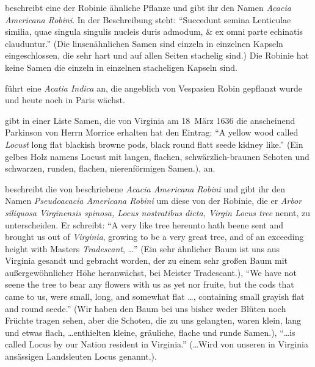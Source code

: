 \documentclass[twocolumn]{scrartcl}
\begin{document}
\citet[S.~171--173]{cornuti1635robinie} beschreibt eine der Robinie
ähnliche Pflanze und gibt ihr den Namen \emph{Acacia Americana
Robini}. In der Beschreibung steht: \enquote{Succedunt semina Lenticulae
similia, quae singula singulis nucleis duris admodum, \& ex omni parte
echinatis clauduntur.} (Die linsenähnlichen Samen sind einzeln in
einzelnen Kapseln eingeschlossen, die sehr hart und auf allen Seiten
stachelig sind.) Die Robinie hat keine Samen die einzeln in einzelnen
stacheligen Kapseln sind.

\citet[S.~28]{deLaBrosse1636robinie} führt eine \emph{Acatia Indica}
an, die angeblich von Vespasien Robin gepflanzt wurde und heute noch
in Paris wächst.

\citet[S.~370]{gunther1922botanists} gibt in einer Liste Samen, die
von Virginia am 18~März 1636 die anscheinend Parkinson von Herrn
Morrice erhalten hat den Eintrag: \enquote{A yellow wood called
\emph{Locust} long flat blackish browne pods, black round flatt seede
kidney like.} (Ein gelbes Holz namens Locust mit langen, flachen,
schwärzlich-braunen Schoten und schwarzen, runden, flachen,
nierenförmigen Samen.), an.

\citet[S.~1550]{parkinson1640theatrumBotanicum} beschreibt die von
\citet{cornuti1635robinie} beschriebene \emph{Acacia Americana Robini}
und gibt ihr den Namen \emph{Pseudoacacia Americana Robini} um diese
von der Robinie, die er \emph{Arbor siliquosa Virginensis spinosa,
Locus nostratibus dicta, Virgin Locus tree} nennt, zu
unterscheiden. Er schreibt: \enquote{A very like tree hereunto hath beene sent and brought us out of \emph{Virginia}, growing to be a very great tree, and of an exceeding height with Masters \emph{Tradescant}, \dots}
(Ein sehr ähnlicher Baum ist uns aus Virginia gesandt und gebracht worden, der zu einem sehr großen Baum mit außergewöhnlicher Höhe heranwächst, bei Meister Tradescant.),
\enquote{We have not seene the tree to bear any flowers with us as yet nor fruite, but the cods that came to us, were small, long, and somewhat flat \dots, containing small grayish flat and round seede.}
(Wir haben den Baum bei uns bisher weder Blüten noch Früchte tragen sehen, aber die Schoten, die zu uns gelangten, waren klein, lang und etwas flach, \dots enthielten kleine, gräuliche, flache und runde Samen.),
\enquote{\dots is called Locus by our Nation resident in Virginia.}
(\dots Wird von unseren in Virginia ansässigen Landsleuten Locus genannt.).
\end{document}

